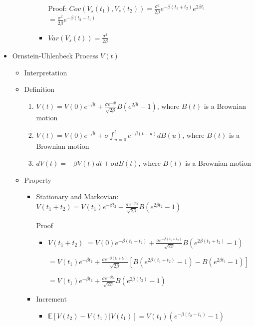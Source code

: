 \documentclass[a4paper]{article}
\begin{document}
\begin{itemize}
\begin{itemize}
\begin{itemize}
\begin{itemize}
                                Proof: $\mathit{Cov}(V_s(t_1), V_s(t_2)) = \frac{\sigma^2}{2\beta} e^{-\beta(t_1 + t_2)} e^{2\beta t_1}$
                                $= \frac{\sigma^2}{2\beta} e^{-\beta(t_2 - t_1)}$
                            \item $\mathit{Var}(V_s(t)) = \frac{\sigma^2}{2\beta}$
                        \end{itemize}
                \end{itemize}
        \end{itemize}
    \item Ornstein-Uhlenbeck Process $V(t)$
        \begin{itemize}
            \item Interpretation
            \item Definition
                \begin{enumerate}
                    \item $V(t) = V(0) e^{-\beta t} + \frac{\sigma e^{-\beta t}}{\sqrt{2\beta }} B(e^{2\beta t} - 1)$, where $B(t)$ is a Brownian motion
                    \item $V(t) = V(0) e^{-\beta t} + \sigma \int_{u=0}^t e^{-\beta (t-u)} d B(u)$, where $B(t)$ is a Brownian motion
                    \item $dV(t) = -\beta V(t) dt + \sigma d B(t)$, where $B(t)$ is a Brownian motion
                \end{enumerate}
            \item Property
                \begin{itemize}
                    \item Stationary and Markovian: $V(t_1 + t_2) = V(t_1) e^{-\beta t_2} + \frac{\sigma e^{-\beta t_2}}{\sqrt{2\beta }} B(e^{2\beta t_2} - 1)$

                        Proof
                        \begin{itemize}
                            \item $V(t_1 + t_2)$
                                $= V(0) e^{-\beta (t_1 + t_2)} + \frac{\sigma e^{-\beta (t_1 + t_2)}}{\sqrt{2\beta }} B(e^{2\beta (t_1 + t_2)} - 1)$

                                $= V(t_1) e^{-\beta t_2} + \frac{\sigma e^{-\beta (t_1 + t_2)}}{\sqrt{2\beta }} [B(e^{2\beta (t_1+t_2)} - 1) - B(e^{2\beta t_1} - 1)]$

                                $= V(t_1) e^{-\beta t_2} + \frac{\sigma e^{-\beta t_2}}{\sqrt{2\beta }} B(e^{2\beta (t_2)} - 1)$
                        \end{itemize}
                    \item Increment
                        \begin{itemize}
                            \item $\mathbb{E}[V(t_2) - V(t_1)|V(t_1)] = V(t_1) (e^{-\beta (t_2 - t_1)} - 1)$


\end{itemize}
\end{itemize}
\end{itemize}
\end{itemize}
\end{document}
